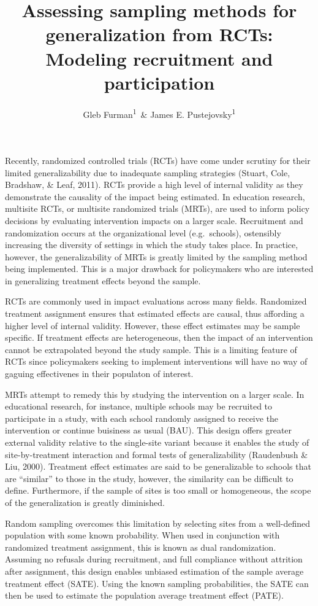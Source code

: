 \documentclass[man,floatsintext]{apa6}
\title{Assessing sampling methods for generalization from RCTs: Modeling recruitment and participation}
\author{Gleb Furman\textsuperscript{1}~\& James E. Pustejovsky\textsuperscript{1}}
\date{}
\affiliation{
\vspace{0.5cm}
\textsuperscript{1} University of Texas at Austin}
\begin{document}
\maketitle

Recently, randomized controlled trials (RCTs) have come under scrutiny for their limited generalizability due to inadequate sampling strategies (Stuart, Cole, Bradshaw, \& Leaf, 2011). RCTs provide a high level of internal validity as they demonstrate the causality of the impact being estimated. In education research, multisite RCTs, or multisite randomized trials (MRTs), are used to inform policy decisions by evaluating intervention impacts on a larger scale. Recruitment and randomization occurs at the organizational level (e.g.~schools), ostensibly increasing the diversity of settings in which the study takes place. In practice, however, the generalizability of MRTs is greatly limited by the sampling method being implemented. This is a major drawback for policymakers who are interested in generalizing treatment effects beyond the sample.

RCTs are commonly used in impact evaluations across many fields. Randomized treatment assignment ensures that estimated effects are causal, thus affording a higher level of internal validity. However, these effect estimates may be sample specific. If treatment effects are heterogeneous, then the impact of an intervention cannot be extrapolated beyond the study sample. This is a limiting feature of RCTs since policymakers seeking to implement interventions will have no way of gaguing effectivenes in their populaton of interest.

MRTs attempt to remedy this by studying the intervention on a larger scale. In educational research, for instance, multiple schools may be recruited to participate in a study, with each school randomly assigned to receive the intervention or continue buisiness as usual (BAU). This design offers greater external validity relative to the single-site variant because it enables the study of site-by-treatment interaction and formal tests of generalizability (Raudenbush \& Liu, 2000). Treatment effect estimates are said to be generalizable to schools that are \enquote{similar} to those in the study, however, the similarity can be difficult to define. Furthermore, if the sample of sites is too small or homogeneous, the scope of the generalization is greatly diminished.

Random sampling overcomes this limitation by selecting sites from a well-defined population with some known probability. When used in conjunction with randomized treatment assignment, this is known as dual randomization. Assuming no refusals during recruitment, and full compliance without attrition after assignment, this design enables unbiased estimation of the sample average treatment effect (SATE). Using the known sampling probabilities, the SATE can then be used to estimate the population average treatment effect (PATE).
\end{document}
